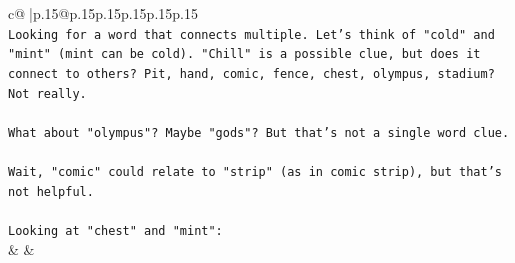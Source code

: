 \documentclass{article}
\begin{document}
{\begin{supertabular}{c@{$\;$}|p{.15\linewidth}@{}p{.15\linewidth}p{.15\linewidth}p{.15\linewidth}p{.15\linewidth}p{.15\linewidth}}
{{{\\ 
\texttt{Looking for a word that connects multiple. Let's think of "cold" and "mint" (mint can be cold). "Chill" is a possible clue, but does it connect to others? Pit, hand, comic, fence, chest, olympus, stadium? Not really. } \\
\\ 
\texttt{What about "olympus"? Maybe "gods"? But that's not a single word clue. } \\
\\ 
\texttt{Wait, "comic" could relate to "strip" (as in comic strip), but that's not helpful. } \\
\\ 
\texttt{Looking at "chest" and "mint":} \\
            }
        }
    }
    & & \\ \\


\end{supertabular}}
\end{document}
